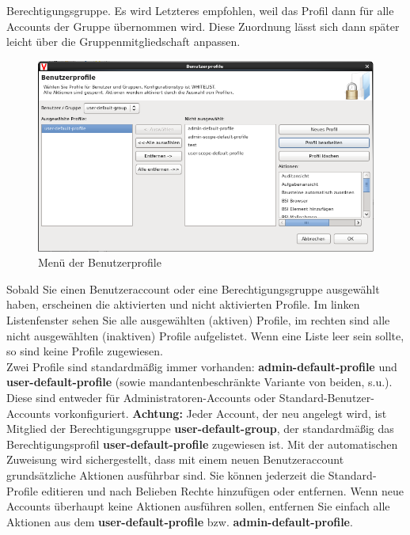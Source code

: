 \documentclass[a4paper,10pt]{book}
\begin{document}
Berechtigungsgruppe. Es wird Letzteres empfohlen, weil das Profil dann für alle Accounts der Gruppe übernommen wird. Diese Zuordnung lässt sich
dann später leicht über die Gruppenmitgliedschaft anpassen.
\newline
\begin{figure}[htb!]
  \centering
  \includegraphics[scale=.45]{Screenshot/Benutzerprofile.png}
  \caption{\label{Menue der Benutzerprofile} Menü der Benutzerprofile}
\end{figure}
\newline
Sobald Sie einen Benutzeraccount oder eine Berechtigungsgruppe ausgewählt haben, erscheinen die aktivierten und nicht aktivierten Profile.
Im linken Listenfenster sehen Sie alle ausgewählten (aktiven) Profile, im rechten sind alle nicht ausgewählten (inaktiven) Profile aufgelistet.
Wenn eine Liste leer sein sollte, so sind keine Profile zugewiesen.
\newline\\
Zwei Profile sind standardmäßig immer vorhanden: \textbf{admin-default-profile} und \textbf{user-default-profile} (sowie mandantenbeschränkte
Variante von beiden, s.u.). Diese sind entweder für Administratoren-Accounts oder Standard-Benutzer-Accounts vorkonfiguriert. \textbf{Achtung:}
Jeder Account, der neu angelegt wird, ist Mitglied der Berechtigungsgruppe \textbf{user-default-group}, der standardmäßig das Berechtigungsprofil
\textbf{user-default-profile} zugewiesen ist. Mit der automatischen Zuweisung wird sichergestellt, dass mit einem neuen Benutzeraccount grundsätzliche
Aktionen ausführbar sind. Sie können jederzeit die Standard-Profile editieren und nach Belieben Rechte hinzufügen oder entfernen.
Wenn neue Accounts überhaupt keine Aktionen ausführen sollen, entfernen Sie einfach alle Aktionen aus dem \textbf{user-default-profile} bzw.
\textbf{admin-default-profile}.
\end{document}
